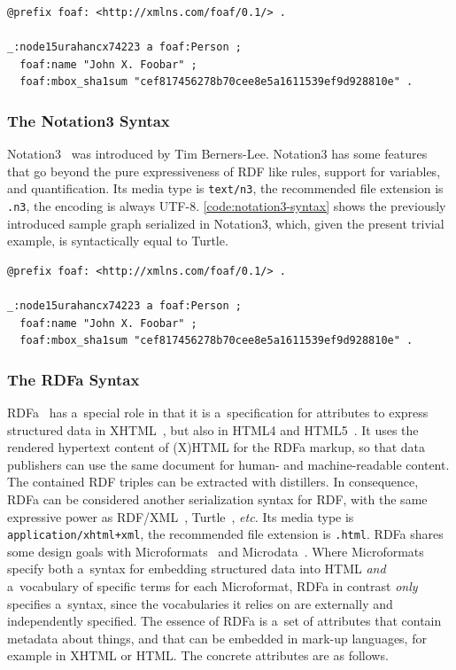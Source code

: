 \begin{lstlisting}[caption={[Sample graph in Turtle syntax]{Sample graph in Turtle syntax,
  the syntax is equivalent to \autoref{code:notation3-syntax}}},
  label={code:turtle-syntax}]
@prefix foaf: <http://xmlns.com/foaf/0.1/> .

_:node15urahancx74223 a foaf:Person ;
  foaf:name "John X. Foobar" ;
  foaf:mbox_sha1sum "cef817456278b70cee8e5a1611539ef9d928810e" .
\end{lstlisting}

\subsubsection{The Notation3 Syntax} \label{sec:notation3}

Notation3~\cite{bernerslee2011notation3} was introduced
by Tim Berners-Lee.
Notation3 has some features that go beyond
the pure expressiveness of RDF like rules,
support for variables, and quantification.
Its media type is \texttt{text/n3},
the recommended file extension is \texttt{.n3},
the encoding is always UTF-8.
\autoref{code:notation3-syntax} shows the previously
introduced sample graph serialized in Notation3,
which, given the present trivial example,
is syntactically equal to Turtle.

\begin{lstlisting}[caption={Sample graph in Notation3 syntax},
  label={code:notation3-syntax}]
@prefix foaf: <http://xmlns.com/foaf/0.1/> .

_:node15urahancx74223 a foaf:Person ;
  foaf:name "John X. Foobar" ;
  foaf:mbox_sha1sum "cef817456278b70cee8e5a1611539ef9d928810e" .
\end{lstlisting}

\subsubsection{The RDFa Syntax}

RDFa~\cite{adida2012rdfa} has a~special role
in that it is a~specification for attributes
to express structured data in XHTML~\cite{pemberton2000xhtml},
but also in HTML4 and HTML5~\cite{sporny2012htmlrdfa}.
It uses the rendered hypertext content of (X)HTML
for the RDFa markup,
so that data publishers can use the same document
for human- and machine-readable content.
The contained RDF triples can be extracted with distillers.
In consequence, RDFa can be considered
another serialization syntax for RDF,
with the same expressive power as
RDF/XML~\cite{beckett2004rdfxml},
Turtle~\cite{prudhommeaux2013turtle}, \emph{etc.}
Its media type is \texttt{application/xhtml+xml},
the recommended file extension is \texttt{.html}.
RDFa shares some design goals
with Microformats~\cite{celik2006microformats}
and Microdata~\cite{hickson2012microdata}.
Where Microformats specify both a~syntax
for embedding structured data into HTML
\emph{and} a~vocabulary of specific terms for each Microformat,
RDFa in contrast \emph{only} specifies a~syntax,
since the vocabularies it relies on
are externally and independently specified.
The essence of RDFa is a~set of attributes
that contain metadata about things,
and that can be embedded in mark-up languages,
for example in XHTML or HTML.
The concrete attributes are as follows.

